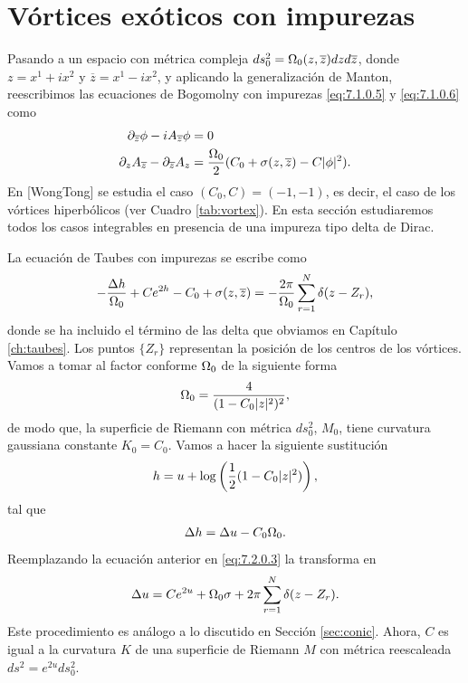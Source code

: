 \section{Vórtices exóticos con impurezas}

Pasando a un espacio con métrica compleja $ds_0^2 = \Omega_0(z,\overline z) dzd\overline z$, donde $z=x^1+ix^2$ y $\overline z=x^1-ix^2$, y aplicando la generalización de Manton, reescribimos las ecuaciones de Bogomolny con impurezas \eqref{eq:7.1.0.5} y \eqref{eq:7.1.0.6} como
\begin{align}
	\partial_{\overline z}\phi-iA_{\overline z}\phi & = 0 \label{eq:7.2.0.1}                                            \\
	\partial_z A_{\overline z}-\partial_{\overline z}A_z & = \frac{\Omega_0}{2}(C_0+\sigma(z,\overline z)-C|\phi|^2).\label{eq:7.2.0.2}
\end{align}
En [WongTong] se estudia el caso $(C_0,C)=(-1,-1)$, es decir, el caso de los vórtices hiperbólicos (ver Cuadro \ref{tab:vortex}). En esta sección estudiaremos todos los casos integrables en presencia de una impureza tipo delta de Dirac.

La ecuación de Taubes con impurezas se escribe como
\begin{align}
	-\frac{\Delta h}{\Omega_0}+C e^{2h}-C_0+\sigma(z,\overline z) = -\frac{2\pi}{\Omega_0}\sum_{r=1}^N\delta(z-Z_r), \label{eq:7.2.0.3}
\end{align}
donde se ha incluido el término de las delta que obviamos en Capítulo \ref{ch:taubes}. Los puntos $\{Z_r\}$ representan la posición de los centros de los vórtices. Vamos a tomar al factor conforme $\Omega_0$ de la siguiente forma
\begin{align}
	\Omega_0 = \frac{4}{(1-C_0|z|^2)^2},
\end{align}
de modo que, la superficie de Riemann con métrica $ds_0^2$, $M_0$, tiene curvatura gaussiana constante $K_0 = C_0$. Vamos a hacer la siguiente sustitución
\begin{align}
	h = u+\log\left(\frac{1}{2}(1-C_0|z|^2)\right),
\end{align}
tal que
\begin{align}
	\Delta h = \Delta u-C_0\Omega_0.
\end{align}
Reemplazando la ecuación anterior en \eqref{eq:7.2.0.3} la transforma en
\begin{align}
	\Delta u = Ce^{2u}+\Omega_0\sigma+2\pi\sum_{r=1}^N\delta(z-Z_r). \label{eq:7.2.0.7}
\end{align}
Este procedimiento es análogo a lo discutido en Sección \ref{sec:conic}. Ahora, $C$ es igual a la curvatura $K$ de una superficie de Riemann $M$ con métrica reescaleada $ds^2 = e^{2u}ds_0^2$.

